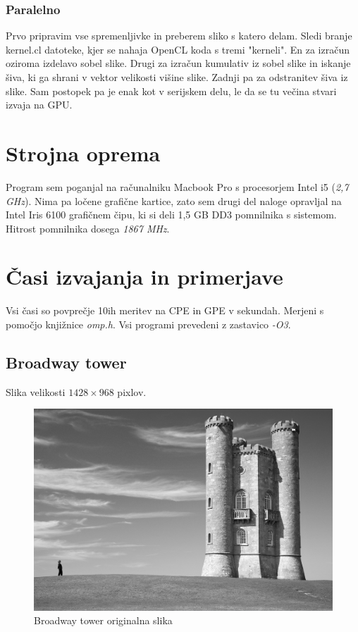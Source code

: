 \documentclass[11pt,a4paper]{article}
\begin{document}
\subsubsection{Paralelno}

Prvo pripravim vse spremenljivke in preberem sliko s katero delam. Sledi branje
kernel.cl datoteke, kjer se nahaja OpenCL koda s tremi "kerneli". En za izračun
oziroma izdelavo sobel slike. Drugi za izračun kumulativ iz sobel slike in iskanje
šiva, ki ga shrani v vektor velikosti višine slike. Zadnji pa za odstranitev
šiva iz slike. Sam postopek pa je enak kot v serijskem delu, le da se tu večina
stvari izvaja na GPU.

\section{Strojna oprema}

Program sem poganjal na računalniku Macbook Pro s procesorjem Intel i5 (\emph{2,7 GHz}).
Nima pa ločene grafične kartice, zato sem drugi del naloge opravljal na Intel Iris 6100
grafičnem čipu, ki si deli 1,5 GB DD3 pomnilnika s sistemom. Hitrost pomnilnika
dosega \emph{1867 MHz}.

\pagebreak

\section{Časi izvajanja in primerjave}

Vsi časi so povprečje 10ih meritev na CPE in GPE v sekundah. Merjeni s pomočjo
knjižnice \emph{omp.h}. Vsi programi prevedeni z zastavico \emph{-O3}.

\subsection{Broadway tower}

Slika velikosti $1428 \times 968$ pixlov.

\begin{figure}[htb]
\begin{center}
\includegraphics[width=0.7\columnwidth]{tower_original.png}
\end{center}
\caption{Broadway tower originalna slika}
\label{fig:tower_original}
\end{figure}
\end{document}
